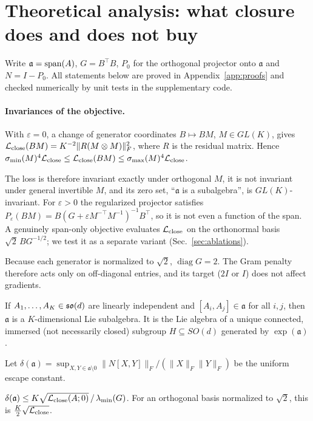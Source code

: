 \section{Theoretical analysis: what closure does and does not buy}\label{sec:theory}
Write $\mathfrak a=\operatorname{span}(A)$, $G=B^\top B$, $P_0$ for the orthogonal projector onto $\mathfrak a$ and $N=I-P_0$.
All statements below are proved in Appendix~\ref{app:proofs} and checked numerically by unit tests in the
supplementary code.

\paragraph{Invariances of the objective.}
With $\varepsilon=0$, a change of generator coordinates $B\mapsto BM$, $M\in GL(K)$, gives
$\mathcal{L}_{\mathrm{close}}(BM)=K^{-2}\|R(M\otimes M)\|_F^2$, where $R$ is the residual matrix. Hence
$\sigma_{\min}(M)^4\mathcal{L}_{\mathrm{close}}\le\mathcal{L}_{\mathrm{close}}(BM)\le\sigma_{\max}(M)^4\mathcal{L}_{\mathrm{close}}$.

The loss is therefore invariant exactly under orthogonal $M$, it is not invariant under general invertible
$M$, and its zero set, ``$\mathfrak a$ is a subalgebra'', is $GL(K)$-invariant. For $\varepsilon>0$ the
regularized projector satisfies $P_\varepsilon(BM)=B(G+\varepsilon M^{-\top}M^{-1})^{-1}B^\top$, so it is
not even a function of the span. A genuinely span-only objective evaluates $\mathcal{L}_{\mathrm{close}}$ on the orthonormal basis
$\sqrt2\,BG^{-1/2}$; we test it as a separate variant (Sec.~\ref{sec:ablations}).

Because each generator is normalized to $\sqrt2$, $\operatorname{diag}G=2$. The Gram penalty therefore acts
only on off-diagonal entries, and its target ($2I$ or $I$) does not affect gradients.

\begin{proposition}\label{prop:integrate}
If $A_1,\dots,A_K\in\mathfrak{so}(d)$ are linearly independent and $[A_i,A_j]\in\mathfrak a$ for all $i,j$, then
$\mathfrak a$ is a $K$-dimensional Lie subalgebra. It is the Lie algebra of a unique connected, immersed (not
necessarily closed) subgroup $H\subseteq SO(d)$ generated by $\exp(\mathfrak a)$.
\end{proposition}

Let $\delta(\mathfrak a)=\sup_{X,Y\in\mathfrak a\setminus 0}\|N[X,Y]\|_F/(\|X\|_F\|Y\|_F)$ be the uniform
escape constant.

\begin{lemma}\label{lem:delta}
$\delta(\mathfrak a)\le K\sqrt{\mathcal{L}_{\mathrm{close}}(A;0)}\,/\,\lambda_{\min}(G)$. For an orthogonal basis normalized to
$\sqrt2$, this is $\tfrac K2\sqrt{\mathcal{L}_{\mathrm{close}}}$.
\end{lemma}

